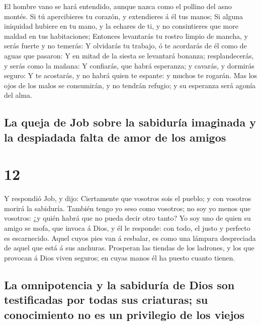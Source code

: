  El hombre vano se hará entendido, aunque nazca como el
pollino del asno montés.  Si tú apercibieres tu corazón, y
extendieres á él tus manos;  Si alguna iniquidad hubiere en
tu mano, y la echares de ti, y no consintieres que more maldad en tus
habitaciones;  Entonces levantarás tu rostro limpio de
mancha, y serás fuerte y no temerás:  Y olvidarás tu
trabajo, ó te acordarás de él como de aguas que pasaron:  Y
en mitad de la siesta se levantará bonanza; resplandecerás, y serás como
la mañana:  Y confiarás, que habrá esperanza; y cavarás, y
dormirás seguro:  Y te acostarás, y no habrá quien te
espante: y muchos te rogarán.  Mas los ojos de los malos se
consumirán, y no tendrán refugio; y su esperanza será agonía del alma.

\hypertarget{la-queja-de-job-sobre-la-sabiduruxeda-imaginada-y-la-despiadada-falta-de-amor-de-los-amigos}{%
\subsection{La queja de Job sobre la sabiduría imaginada y la despiadada
falta de amor de los
amigos}\label{la-queja-de-job-sobre-la-sabiduruxeda-imaginada-y-la-despiadada-falta-de-amor-de-los-amigos}}

\hypertarget{section-11}{%
\section{12}\label{section-11}}

 Y respondió Job, y dijo:  Ciertamente que
vosotros sois el pueblo; y con vosotros morirá la sabiduría.
 También tengo yo seso como vosotros; no soy yo menos que
vosotros: ¿y quién habrá que no pueda decir otro tanto?  Yo
soy uno de quien su amigo se mofa, que invoca á Dios, y él le responde:
con todo, el justo y perfecto es escarnecido.  Aquel cuyos
pies van á resbalar, es como una lámpara despreciada de aquel que está á
sus anchuras.  Prosperan las tiendas de los ladrones, y los
que provocan á Dios viven seguros; en cuyas manos él ha puesto cuanto
tienen.

\hypertarget{la-omnipotencia-y-la-sabiduruxeda-de-dios-son-testificadas-por-todas-sus-criaturas-su-conocimiento-no-es-un-privilegio-de-los-viejos}{%
\subsection{La omnipotencia y la sabiduría de Dios son testificadas por
todas sus criaturas; su conocimiento no es un privilegio de los
viejos}\label{la-omnipotencia-y-la-sabiduruxeda-de-dios-son-testificadas-por-todas-sus-criaturas-su-conocimiento-no-es-un-privilegio-de-los-viejos}}

